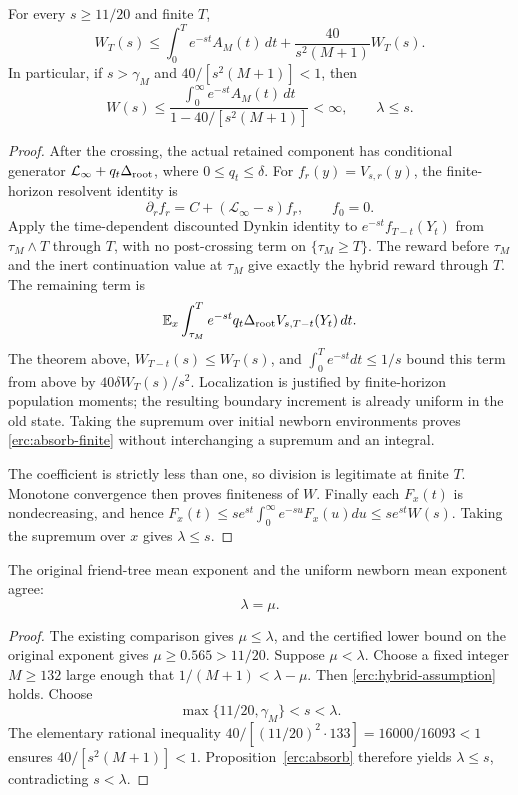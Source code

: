 \begin{proposition}
\label{erc:absorb}
For every $s\ge11/20$ and finite $T$,
\begin{equation}\label{erc:absorb-finite}
 W_T(s)\le\int_0^T e^{-st}A_M(t)\,dt
                 +\frac{40}{s^2(M+1)}W_T(s).
\end{equation}
In particular, if $s>\gamma_M$ and $40/[s^2(M+1)]<1$, then
\begin{equation}\label{erc:absorb-bound}
 W(s)\le
 \frac{\int_0^\infty e^{-st}A_M(t)\,dt}
      {1-40/[s^2(M+1)]}<\infty,
 \qquad\lambda\le s.
\end{equation}
\end{proposition}
\begin{proof}
After the crossing, the actual retained component has conditional
generator $\mathcal L_\infty+q_t\Delta_{\rm root}$, where
$0\le q_t\le\delta$.  For $f_r(y)=V_{s,r}(y)$, the finite-horizon
resolvent identity is
\[
 \partial_rf_r=C+(\mathcal L_\infty-s)f_r,\qquad f_0=0.
\]
Apply the time-dependent discounted Dynkin identity to
$e^{-st}f_{T-t}(Y_t)$ from $\tau_M\wedge T$ through $T$, with no
post-crossing term on $\{\tau_M\ge T\}$.  The reward before
$\tau_M$ and the inert continuation value at $\tau_M$ give exactly
the hybrid reward through $T$.  The remaining term is
\[
 \mathbb E_x\int_{\tau_M}^T e^{-st}q_t
             \Delta_{\rm root}V_{s,T-t}(Y_t)\,dt.
\]
The theorem above, $W_{T-t}(s)\le W_T(s)$, and
$\int_0^T e^{-st}dt\le1/s$ bound this term from above by
$40\delta W_T(s)/s^2$.  Localization is justified by finite-horizon
population moments; the resulting boundary increment is already
uniform in the old state.  Taking the supremum over initial newborn
environments proves \eqref{erc:absorb-finite} without interchanging a
supremum and an integral.

The coefficient is strictly less than one, so division is legitimate
at finite $T$.  Monotone convergence then proves finiteness of $W$.
Finally each $F_x(t)$ is nondecreasing, and hence
$F_x(t)\le se^{st}\int_0^\infty e^{-su}F_x(u)du\le se^{st}W(s)$.
Taking the supremum over $x$ gives $\lambda\le s$.
\end{proof}

\begin{theorem}
\label{erc:equality}
The original friend-tree mean exponent and the uniform newborn mean
exponent agree:
\begin{equation}\label{erc:lambda-mu}
 \boxed{\lambda=\mu.}
\end{equation}
\end{theorem}
\begin{proof}
The existing comparison gives $\mu\le\lambda$, and the certified lower
bound on the original exponent gives $\mu\ge0.565>11/20$.
Suppose $\mu<\lambda$.  Choose a fixed integer $M\ge132$ large enough
that $1/(M+1)<\lambda-\mu$.  Then \eqref{erc:hybrid-assumption} holds.
Choose
\[
 \max\{11/20,\gamma_M\}<s<\lambda.
\]
The elementary rational inequality
$40/[(11/20)^2\cdot133]=16000/16093<1$ ensures
$40/[s^2(M+1)]<1$.  Proposition~\ref{erc:absorb} therefore yields
$\lambda\le s$, contradicting $s<\lambda$.
\end{proof}

